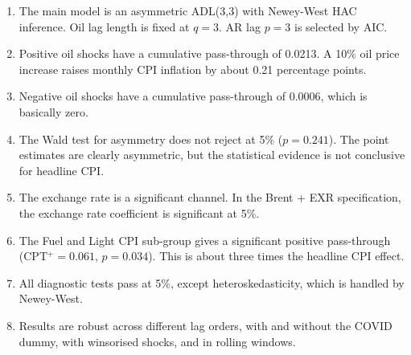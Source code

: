 \documentclass[12pt,a4paper]{article}
\begin{document}
\begin{enumerate}[leftmargin=*, noitemsep]

\item The main model is an asymmetric ADL(3,3) with Newey-West HAC inference. Oil lag length is fixed at $q = 3$. AR lag $p = 3$ is selected by AIC.

\item Positive oil shocks have a cumulative pass-through of 0.0213. A 10\% oil price increase raises monthly CPI inflation by about 0.21 percentage points.

\item Negative oil shocks have a cumulative pass-through of 0.0006, which is basically zero.

\item The Wald test for asymmetry does not reject at 5\% ($p = 0.241$). The point estimates are clearly asymmetric, but the statistical evidence is not conclusive for headline CPI.

\item The exchange rate is a significant channel. In the Brent + EXR specification, the exchange rate coefficient is significant at 5\%.

\item The Fuel and Light CPI sub-group gives a significant positive pass-through (CPT$^+ = 0.061$, $p = 0.034$). This is about three times the headline CPI effect.

\item All diagnostic tests pass at 5\%, except heteroskedasticity, which is handled by Newey-West.

\item Results are robust across different lag orders, with and without the COVID dummy, with winsorised shocks, and in rolling windows.

\end{enumerate}
\end{document}
